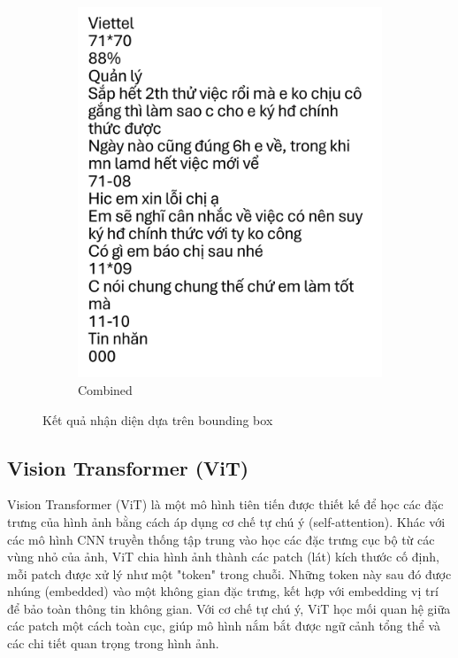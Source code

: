 \documentclass[11pt]{article}
\begin{document}
\begin{figure}[h!]
\begin{subfigure}{0.3\linewidth}
        \includegraphics[width=\linewidth]{Picture4.png}
        \caption{Combined}
    \end{subfigure}
    \caption{Kết quả nhận diện dựa trên bounding box}
\end{figure}
\vspace*{-3mm}
\vspace*{-2mm}
\subsection{Vision Transformer (ViT)}
\hspace*{5mm}Vision Transformer (ViT) là một mô hình tiên tiến được thiết kế để học các đặc trưng của hình ảnh bằng cách áp dụng cơ chế tự chú ý (self-attention). Khác với các mô hình CNN truyền thống tập trung vào học các đặc trưng cục bộ từ các vùng nhỏ của ảnh, ViT chia hình ảnh thành các patch (lát) kích thước cố định, mỗi patch được xử lý như một "token" trong chuỗi. Những token này sau đó được nhúng (embedded) vào một không gian đặc trưng, kết hợp với embedding vị trí để bảo toàn thông tin không gian. Với cơ chế tự chú ý, ViT học mối quan hệ giữa các patch một cách toàn cục, giúp mô hình nắm bắt được ngữ cảnh tổng thể và các chi tiết quan trọng trong hình ảnh.
\end{document}
